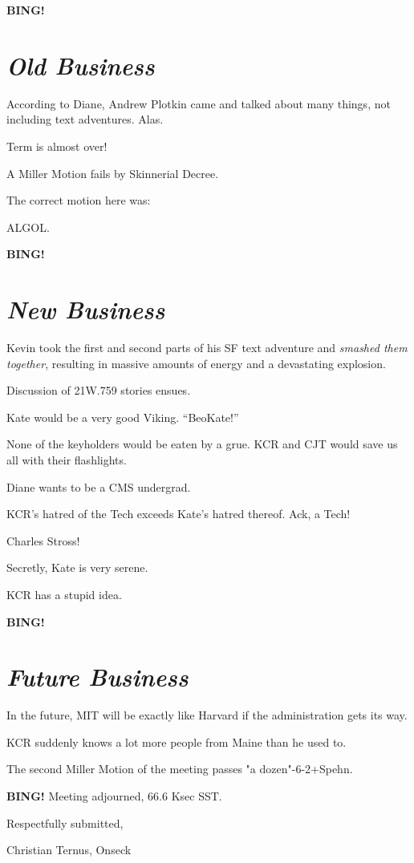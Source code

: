 \documentclass[10pt]{article}
\newcommand{\bing}{{\bf BING!} }
\newcommand{\goto}[1]{\bing \vskip 12pt \section*{{\em{#1}}}}
\begin{document}
\goto{Old Business}

According to Diane, Andrew Plotkin came and talked about many things, not including text adventures.  Alas.

Term is almost over!

A Miller Motion fails by Skinnerial Decree.

The correct motion here was:

ALGOL.

\goto{New Business}

Kevin took the first and second parts of his SF text adventure and \emph{smashed them together}, resulting in massive amounts of energy and a devastating explosion.

Discussion of 21W.759 stories ensues.

Kate would be a very good Viking.  ``BeoKate!''

None of the keyholders would be eaten by a grue. KCR and CJT would save us all with their flashlights.

Diane wants to be a CMS undergrad.

KCR's hatred of the Tech exceeds Kate's hatred thereof.  Ack, a Tech!

Charles Stross!

Secretly, Kate is very serene.

KCR has a stupid idea.

\goto{Future Business}

In the future, MIT will be exactly like Harvard if the administration gets its way.

KCR suddenly knows a lot more people from Maine than he used to.

The second Miller Motion of the meeting passes "a dozen"-6-2+Spehn.

\bing
\noindent
Meeting adjourned, 66.6 Ksec SST.

\vspace{18pt}

\centerline{Respectfully submitted,}
\centerline{Christian Ternus, Onseck}
\end{document}
